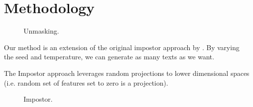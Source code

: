 \chapter{Methodology}
\label{chap:methodology}








\begin{figure}[htbp]
    \centering
    
    \caption{Unmasking.}
    \label{fig:unmasking}
\end{figure}
Our method is an extension of the original impostor approach by \citet{koppel_determining_2014}.
By varying the seed and temperature, we can generate as many texts as we want.
  
    
The Impostor approach leverages random projections to lower dimensional spaces (i.e. random set of features set to zero is a projection).
\begin{figure}[htbp]
    \centering
    
    \caption{Impostor.}
    \label{fig:impostor}
\end{figure}


